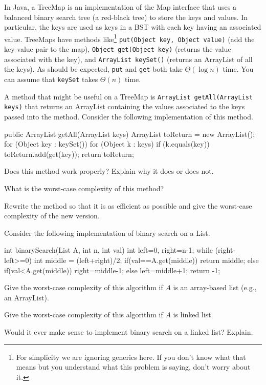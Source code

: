\begin{pro}
In Java, a TreeMap is an implementation of the Map interface that uses a balanced binary search tree (a red-black tree) to store the keys and values.  In particular, the keys are used as keys in a BST with each key having an associated value.  TreeMaps have methods like\footnote{For simplicity we are ignoring generics here.  If you don't know what that means but you understand what this problem is saying, don't worry about it.} 
\verb+put(Object key, Object value)+ (add the key-value pair to the map), 
\verb+Object get(Object key)+ (returns the value
associated with the key), 
and \verb+ArrayList keySet()+ (returns an ArrayList of all the keys).  
As should be expected, \verb+put+ and \verb+get+ both take $\Theta(\log n)$ time.
You can assume that \verb+keySet+ takes $\Theta(n)$ time.

A method that might be useful on a TreeMap is \verb+ArrayList getAll(ArrayList keys)+ that
returns an ArrayList containing the values associated to the keys passed into the method. 
Consider the following implementation of this method.
\begin{code}
public ArrayList getAll(ArrayList keys) {
    ArrayList toReturn = new ArrayList();
    for (Object key : keySet()) {
        for (Object k : keys) {
            if (k.equals(key)) {
                toReturn.add(get(key));
            }
        }
    }
    return toReturn;
}
\end{code}
\begin{lenum}
\item
Does this method work properly?  Explain why it does or does not.
\item
What is the worst-case complexity of this method?
\item
Rewrite the method so that it is as efficient as possible and give the worst-case complexity of the new version.
\end{lenum}
\end{pro}

\begin{pro}
Consider the following implementation of binary search on a List.
\begin{code}
    int binarySearch(List A, int n, int val) {
       int left=0, right=n-1;
       while (right-left>=0) {
           int middle = (left+right)/2;
           if(val==A.get(middle)) 
               return middle;
           else if(val<A.get(middle)) 
               right=middle-1;
           else 
               left=middle+1; 
        }
       return -1;
    }
\end{code}
\begin{lenum}
\item
Give the worst-case complexity of this algorithm if $A$ is an array-based list (e.g., an ArrayList).
\item
Give the worst-case complexity of this algorithm if $A$ is linked list.
\item
Would it ever make sense to implement binary search on a linked list?  Explain.
\end{lenum}
\end{pro}

